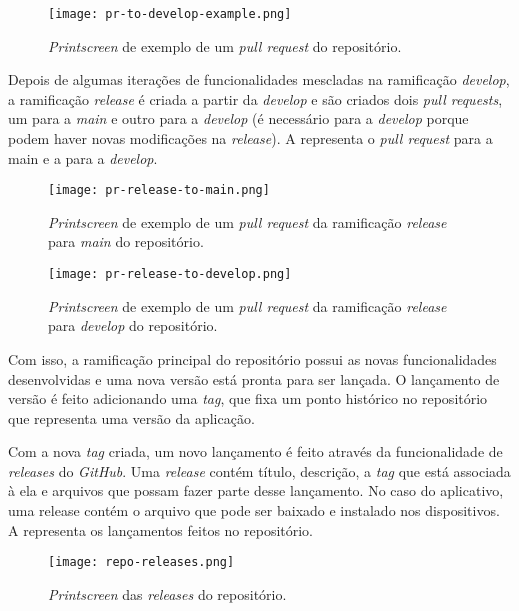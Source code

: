 \begin{figure}[!htb]
  \centering
  \texttt{[image: pr-to-develop-example.png]}
  \caption{\textit{Printscreen} de exemplo de um \textit{pull request} do repositório.}
  \label{fig:cfpr}
\end{figure}

Depois de algumas iterações de funcionalidades mescladas na ramificação \textit{develop}, a ramificação \textit{release} é criada a partir da \textit{develop} e são criados dois \textit{pull requests}, um para a \textit{main} e outro para a \textit{develop} (é necessário para a \textit{develop} porque podem haver novas modificações na \textit{release}). A  representa o \textit{pull request} para a main e a  para a \textit{develop}.

\begin{figure}[!htb]
  \centering
  \texttt{[image: pr-release-to-main.png]}
  \caption{\textit{Printscreen} de exemplo de um \textit{pull request} da ramificação \textit{release} para \textit{main} do repositório.}
  \label{fig:releasemainpr}
\end{figure}

\begin{figure}[!htb]
  \centering
  \texttt{[image: pr-release-to-develop.png]}
  \caption{\textit{Printscreen} de exemplo de um \textit{pull request} da ramificação \textit{release} para \textit{develop} do repositório.}
  \label{fig:releasedeveloppr}
\end{figure}

Com isso, a ramificação principal do repositório possui as novas funcionalidades desenvolvidas e uma nova versão está pronta para ser lançada. O lançamento de versão é feito adicionando uma \textit{tag}, que fixa um ponto histórico no repositório que representa uma versão da aplicação.

Com a nova \textit{tag} criada, um novo lançamento é feito através da funcionalidade de \textit{releases} do \textit{GitHub}. Uma \textit{release} contém título, descrição, a \textit{tag} que está associada à ela e arquivos que possam fazer parte desse lançamento. No caso do aplicativo, uma release contém o arquivo  que pode ser baixado e instalado nos dispositivos. A  representa os lançamentos feitos no repositório.

\begin{figure}[!htb]
  \centering
  \texttt{[image: repo-releases.png]}
  \caption{\textit{Printscreen} das \textit{releases} do repositório.}
  \label{fig:currentreleases}
\end{figure}

